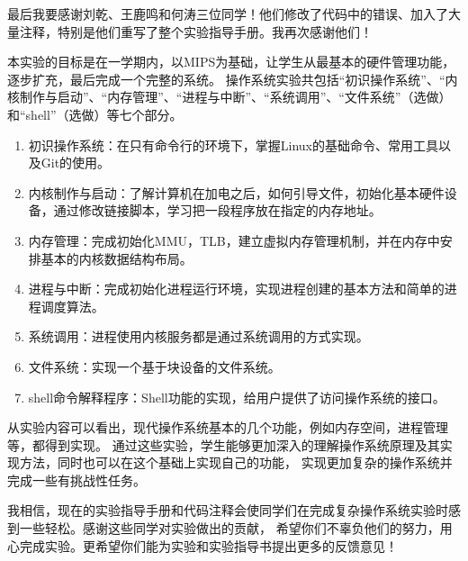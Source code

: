 最后我要感谢刘乾、王鹿鸣和何涛三位同学！他们修改了代码中的错误、加入了大量注释，特别是他们重写了整个实验指导手册。我再次感谢他们！

本实验的目标是在一学期内，以MIPS为基础，让学生从最基本的硬件管理功能，逐步扩充，最后完成一个完整的系统。
操作系统实验共包括“初识操作系统”、“内核制作与启动”、“内存管理”、“进程与中断”、“系统调用”、“文件系统”（选做）和“shell”（选做）等七个部分。
\begin{enumerate}
 \item 初识操作系统：在只有命令行的环境下，掌握Linux的基础命令、常用工具以及Git的使用。
 \item 内核制作与启动：了解计算机在加电之后，如何引导文件，初始化基本硬件设备，通过修改链接脚本，学习把一段程序放在指定的内存地址。
 \item 内存管理：完成初始化MMU，TLB，建立虚拟内存管理机制，并在内存中安排基本的内核数据结构布局。
 \item 进程与中断：完成初始化进程运行环境，实现进程创建的基本方法和简单的进程调度算法。
 \item 系统调用：进程使用内核服务都是通过系统调用的方式实现。
 \item 文件系统：实现一个基于块设备的文件系统。
 \item shell命令解释程序：Shell功能的实现，给用户提供了访问操作系统的接口。
\end{enumerate}

从实验内容可以看出，现代操作系统基本的几个功能，例如内存空间，进程管理等，都得到实现。
通过这些实验，学生能够更加深入的理解操作系统原理及其实现方法，同时也可以在这个基础上实现自己的功能，
实现更加复杂的操作系统并完成一些有挑战性任务。

我相信，现在的实验指导手册和代码注释会使同学们在完成复杂操作系统实验时感到一些轻松。感谢这些同学对实验做出的贡献，
希望你们不辜负他们的努力，用心完成实验。更希望你们能为实验和实验指导书提出更多的反馈意见！

